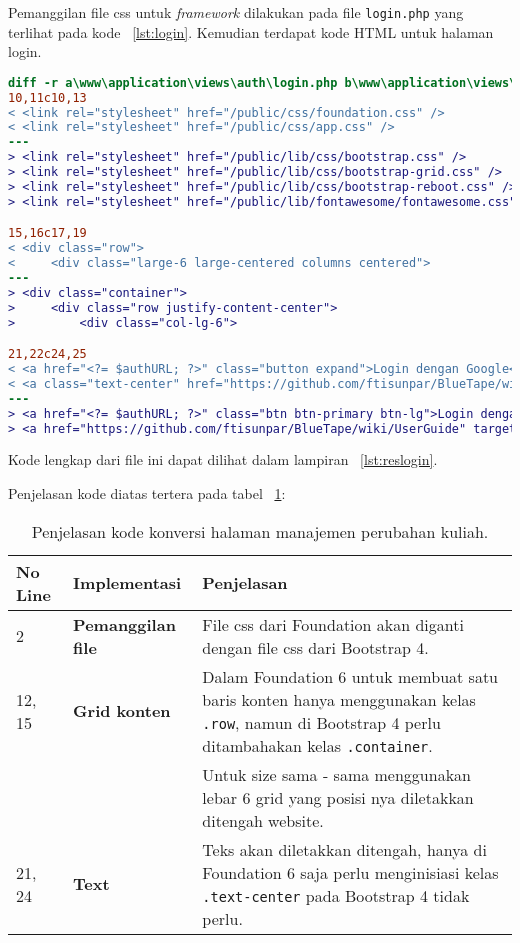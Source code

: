 Pemanggilan file css untuk \textit{framework} dilakukan pada file \texttt{login.php} yang terlihat pada kode ~\ref{lst:login}. Kemudian terdapat kode HTML untuk halaman login.
\begin{lstlisting}[language=diff, caption=Perubahan file \path{\views\auth\login.php},  basicstyle=\ttfamily, frame=single,
columns=fullflexible, keepspaces=true, breaklines=true, label={lst:login}]
diff -r a\www\application\views\auth\login.php b\www\application\views\auth\login.php
10,11c10,13
< <link rel="stylesheet" href="/public/css/foundation.css" />
< <link rel="stylesheet" href="/public/css/app.css" />
---
> <link rel="stylesheet" href="/public/lib/css/bootstrap.css" />
> <link rel="stylesheet" href="/public/lib/css/bootstrap-grid.css" />
> <link rel="stylesheet" href="/public/lib/css/bootstrap-reboot.css" />
> <link rel="stylesheet" href="/public/lib/fontawesome/fontawesome.css" />

15,16c17,19
< <div class="row">
<     <div class="large-6 large-centered columns centered">
---
> <div class="container">
>     <div class="row justify-content-center">
>         <div class="col-lg-6">

21,22c24,25
< <a href="<?= $authURL; ?>" class="button expand">Login dengan Google</a><br/><br/>
< <a class="text-center" href="https://github.com/ftisunpar/BlueTape/wiki/UserGuide" target="_blank">Petunjuk Penggunaan</a>
---
> <a href="<?= $authURL; ?>" class="btn btn-primary btn-lg">Login dengan Google</a><br/><br/>
> <a href="https://github.com/ftisunpar/BlueTape/wiki/UserGuide" target="_blank">Petunjuk Penggunaan</a>
\end{lstlisting}
Kode lengkap dari file ini dapat dilihat dalam lampiran ~\ref{lst:reslogin}.

\noindent Penjelasan kode diatas tertera pada tabel ~\ref{table:KodeManajemenPerubahanKuliah}:
\begin{table}[H]
	\centering
	\caption{Penjelasan kode konversi halaman manajemen perubahan kuliah.}
	\begin{tabularx}{\textwidth}{llX}
		\toprule
		No Line & Implementasi     & Penjelasan \\
		\midrule
		2 & \textbf{Pemanggilan file} & File css dari Foundation akan diganti dengan file css dari Bootstrap 4.\\
		12, 15 & \textbf{Grid konten} & Dalam Foundation 6 untuk membuat satu baris konten hanya menggunakan kelas \texttt{.row}, namun di Bootstrap 4 perlu ditambahakan kelas \texttt{.container}.\\
		& & Untuk size sama - sama menggunakan lebar 6 grid yang posisi nya diletakkan ditengah website.\\
		21, 24 & \textbf{Text} & Teks akan diletakkan ditengah, hanya di Foundation 6 saja perlu menginisiasi kelas \texttt{.text-center} pada Bootstrap 4 tidak perlu.\\
		\bottomrule
	\end{tabularx}%
	\label{table:KodeManajemenPerubahanKuliah}
\end{table}


